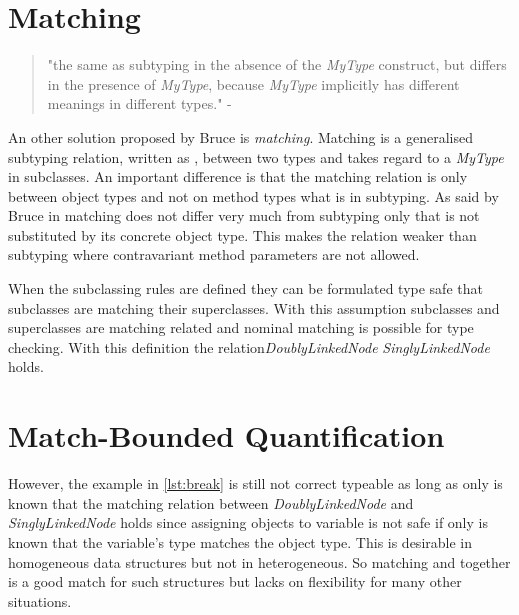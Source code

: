 \section{Matching}
\begin{quotation}
"the same as subtyping in the absence of the \emph{MyType}
construct, but differs in the presence of \emph{MyType}, because
\emph{MyType} implicitly has different meanings in different types." -
\cite{bruce_foundations_2002}
\end{quotation}

An other solution proposed by Bruce \cite{bruce_binary_1995} is
\emph{matching}. Matching is a generalised subtyping relation, written
as \match, between two types and takes regard to a \emph{MyType} in
subclasses. An important difference is that the matching relation is only
between object types and not on method types what is in subtyping. As
said by Bruce in \cite{bruce_foundations_2002} matching does not differ
very much from subtyping only that \MyType is not substituted by its
concrete object type. This makes the relation weaker than subtyping
where contravariant method parameters are not allowed.

When the subclassing rules are defined they can be formulated
type safe that subclasses are matching their superclasses. With
this assumption subclasses and superclasses are matching related and
nominal matching is possible for type checking. With this definition
the relation\emph{DoublyLinkedNode} \match \emph{SinglyLinkedNode} holds.






\section{Match-Bounded Quantification}
However, the example in \autoref{lst:break} is still not correct
typeable as long as only is known that the matching relation between
\emph{DoublyLinkedNode} and \emph{SinglyLinkedNode} holds since assigning
objects to variable is not safe if only is known that the variable's type
matches the object type. This is desirable in homogeneous data structures
but not in heterogeneous. So matching and \MyType together is a good match
for such structures but lacks on flexibility for many other situations.

